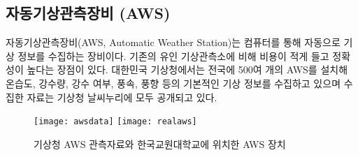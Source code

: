 \subsection{자동기상관측장비 (AWS)}
자동기상관측장비(AWS, Automatic Weather Station)는 컴퓨터를 통해 자동으로 기상 정보를 수집하는 장비이다. 기존의 유인 기상관측소에 비해 비용이 적게 들고 정확성이 높다는 장점이 있다. 대한민국 기상청에서는 전국에 500여 개의 AWS를 설치해 온습도, 강수량, 강수 여부, 풍속, 풍향 등의 기본적인 기상 정보를 수집하고 있으며 수집한 자료는 기상청 날씨누리에 모두 공개되고 있다. \cite{Ref1}

\begin{figure}[htbp]
	\centering
	\texttt{[image: awsdata]}
	\texttt{[image: realaws]}
	\caption{기상청 AWS 관측자료와 한국교원대학교에 위치한 AWS 장치}
	\label{AWS}
\end{figure}